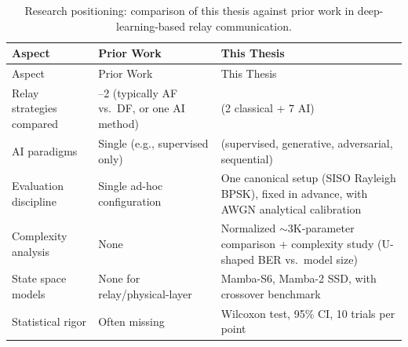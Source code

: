 \begin{longtable}[]{@{}
  >{\raggedright\arraybackslash}p{}
  >{\raggedright\arraybackslash}p{}
  >{\raggedright\arraybackslash}p{}@{}}
\caption{Research positioning: comparison of this thesis against prior work in deep-learning-based relay communication.}\label{tbl:table17}\tabularnewline
\toprule\noalign{}
\begin{minipage}[b]{\linewidth}\raggedright
Aspect
\end{minipage} & \begin{minipage}[b]{\linewidth}\raggedright
Prior Work
\end{minipage} & \begin{minipage}[b]{\linewidth}\raggedright
This Thesis
\end{minipage} \\
\midrule\noalign{}
\endfirsthead
\toprule\noalign{}
\begin{minipage}[b]{\linewidth}\raggedright
Aspect
\end{minipage} & \begin{minipage}[b]{\linewidth}\raggedright
Prior Work
\end{minipage} & \begin{minipage}[b]{\linewidth}\raggedright
This Thesis
\end{minipage} \\
\midrule\noalign{}
\endhead
\bottomrule\noalign{}
\endlastfoot
Relay strategies compared & 1--2 (typically AF vs.~DF, or one AI method) & 9 (2 classical + 7 AI) \\
AI paradigms & Single (e.g., supervised only) & 4 (supervised, generative, adversarial, sequential) \\
Evaluation discipline & Single ad-hoc configuration & One canonical setup (SISO Rayleigh BPSK), fixed in advance, with AWGN analytical calibration \\
Complexity analysis & None & Normalized $\sim$3K-parameter comparison + complexity study (U-shaped BER vs.\ model size) \\
State space models & None for relay/physical-layer & Mamba-S6, Mamba-2 SSD, with crossover benchmark \\
Statistical rigor & Often missing & Wilcoxon test, 95\% CI, 10 trials per point \\
\end{longtable}



